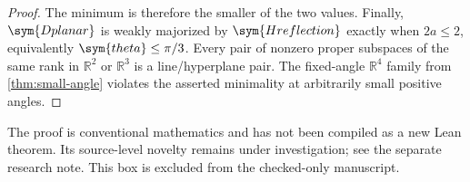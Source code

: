 \begin{tcolorbox}
\begin{proof}
The minimum is therefore the smaller of the two values.
Finally, $\sym{Dplanar}$ is weakly majorized by $\sym{Hreflection}$ exactly when $2a\leq2$,
equivalently $\sym{theta}\leq\pi/3$. Every pair of nonzero proper
subspaces of the same rank in $\mathbb R^2$ or $\mathbb R^3$
is a line/hyperplane pair. The fixed-angle $\mathbb R^4$ family
from \cref{thm:small-angle} violates the asserted minimality at
arbitrarily small positive angles.
\end{proof}
The proof is conventional mathematics and has not been compiled as a
new Lean theorem. Its source-level novelty remains under investigation;
see the separate research note. This box is excluded from the
checked-only manuscript.
\end{tcolorbox}
\fi
